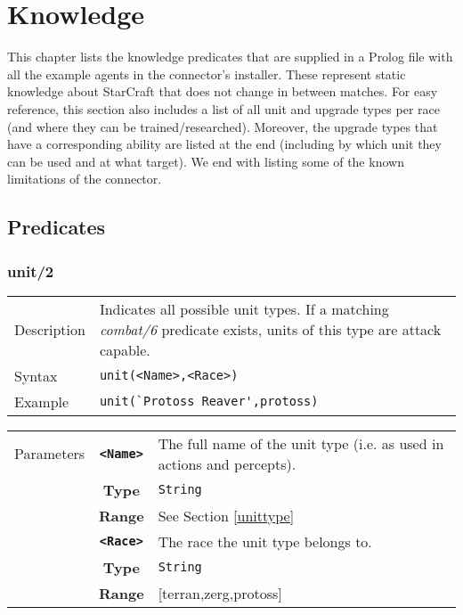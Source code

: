 \chapter{Knowledge}

This chapter lists the knowledge predicates that are supplied in a Prolog file with all the example agents in the connector's installer. These represent static knowledge about StarCraft that does not change in between matches. For easy reference, this section also includes a list of all unit and upgrade types per race (and where they can be trained/researched). Moreover, the upgrade types that have a corresponding ability are listed at the end (including by which unit they can be used and at what target). We end with listing some of the known limitations of the connector.

\section{Predicates}
\subsection{unit/2}
\begin{tabularx}{\textwidth}{lX}
 Description & Indicates all possible unit types. If a matching \textit{combat/6} predicate exists, units of this type are attack capable. \\
 Syntax & \verb|unit(<Name>,<Race>)| \\
 Example & \verb|unit(`Protoss Reaver',protoss)| \\
 \end{tabularx}
 \begin{tabularx}{\textwidth}{l | c | p{8cm}|}
 \cline{2-3}
 Parameters & \textbf{\verb|<Name>|} & The full name of the unit type (i.e. as used in actions and percepts). \\
            & \textbf{Type} & \verb|String| \\
            & \textbf{Range} & See Section \ref{unittype} \\
            \cline{2-3}
 			& \textbf{\verb|<Race>|} & The race the unit type belongs to.\\
            & \textbf{Type} & \verb|String| \\
            & \textbf{Range} & [terran,zerg,protoss] \\
            \cline{2-3}
\end{tabularx}

